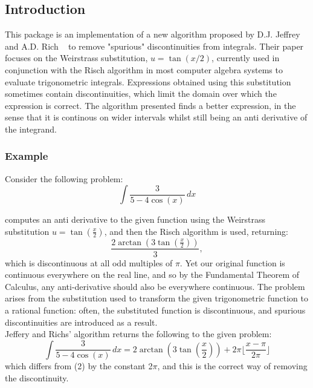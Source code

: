 \subsection{Introduction}
This package is an implementation of a new algorithm proposed by D.J. Jeffrey and A.D. Rich ~\cite{JeffreyRich:94} to remove "spurious" discontinuities from integrals. Their paper focuses on the Weirstrass substitution, $u=\tan(x/2)$, currently used in conjunction with the Risch algorithm in most computer algebra systems to evaluate trigonometric integrals. Expressions obtained using this substitution sometimes contain discontinuities, which limit the domain over which the expression is correct. The algorithm presented finds a better expression, in the sense that it is continous on wider intervals whilst still being an anti derivative of the integrand.

\subsubsection{Example}
 Consider the following problem:
     \[ \int \frac{3}{5-4\cos(x)}\,dx  \]

\REDUCE computes an anti derivative to the given function using the Weirstrass substitution $u=\tan(\frac{x}{2})$, and then the Risch algorithm is used, returning:
    \[ \frac{2\arctan(3\tan(\frac{x}{2}))}{3}, \]
which is discontinuous at all odd multiples of $\pi$. Yet our original function is continuous everywhere on the real line, and so by the Fundamental Theorem of Calculus, any anti-derivative should also be everywhere continuous. The problem arises from the substitution used to transform the given trigonometric function to a rational function: often, the substituted function is discontinuous, and spurious discontinuities are introduced as a result. \\
Jeffery and Richs' algorithm returns the following to the given problem:
\[ \int \frac{3}{5-4\cos(x)}\,dx = 2\arctan(3\tan(\frac{x}{2}))+2\pi\lfloor \frac{x-\pi}{2\pi} \rfloor \]
which differs from (2) by the constant 2$\pi$, and this is the correct way of removing the discontinuity.

